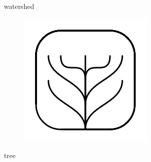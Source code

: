\documentclass[11pt]{article}
\begin{document}
watershed
\begin{figure}
\includegraphics[scale=0.3]{image15.png}
\end{figure}
tree
\end{document}
